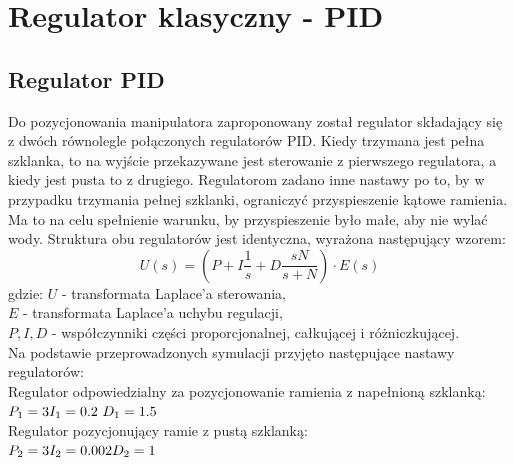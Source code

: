 \chapter{Regulator klasyczny - PID}
\label{cha:regulator}

\section{Regulator PID}
Do pozycjonowania manipulatora zaproponowany został regulator składający się z dwóch równolegle połączonych regulatorów PID. Kiedy trzymana jest pełna szklanka, to na wyjście przekazywane jest sterowanie z pierwszego regulatora, a kiedy jest pusta to z drugiego. Regulatorom zadano inne nastawy po to, by w przypadku trzymania pełnej szklanki, ograniczyć przyspieszenie kątowe ramienia. Ma to na celu spełnienie warunku, by przyspieszenie było małe, aby nie wylać wody. Struktura obu regulatorów jest identyczna, wyrażona następujący wzorem:
\begin{equation}\label{key}
U(s) = (P + I \frac{1}{s} + D\frac{sN}{s+N}) \cdot E(s)
\end{equation}
gdzie:\newline
$U$ - transformata Laplace'a sterowania,\\
$E$ - transformata Laplace'a uchybu regulacji,\\
$P, I, D$ - współczynniki części proporcjonalnej, całkującej i różniczkującej.\\
\newline
Na podstawie przeprowadzonych symulacji przyjęto następujące nastawy regulatorów:\\
Regulator odpowiedzialny za pozycjonowanie ramienia z napełnioną szklanką:\\
$
P_1 = 3\\
I_1 = 0.2\\\
D_1 = 1.5\\
$\\
Regulator pozycjonujący ramie z pustą szklanką:\\
$
P_2 = 3\\
I_2 = 0.002\\
D_2 = 1\\
$

